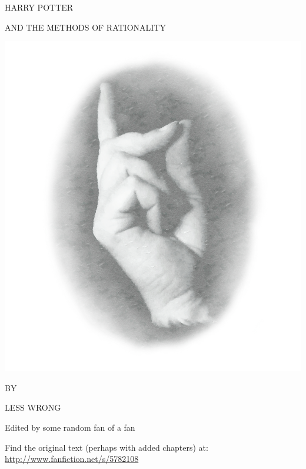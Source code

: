 \begin{center}
\thispagestyle{empty}
{\hp
\Huge\MakeUppercase{Harry Potter}\vspace*{0.5cm}

\Large\MakeUppercase{and the Methods of Rationality} %
 
\includegraphics[scale=0.5]{bubble0.png} 

\Large BY \vspace*{.25cm}

\huge LESS WRONG%

\normalsize
Edited by some random fan of a fan
}

\vspace{4cm}
Find the original text (perhaps with added chapters) at:\\
\url{http://www.fanfiction.net/s/5782108}

\end{center}
\clearpage

